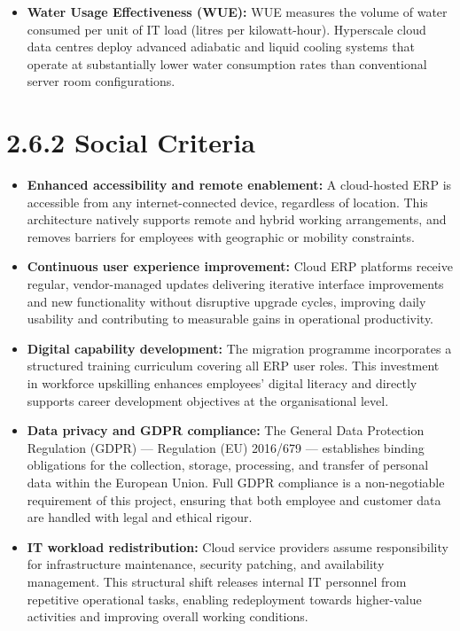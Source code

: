 \begin{itemize}[leftmargin=*, label=\textcolor{midgreen}{$\bullet$}]
  \item \textbf{Water Usage Effectiveness (WUE):} WUE measures the volume
    of water consumed per unit of IT load (litres per kilowatt-hour).
    Hyperscale cloud data centres deploy advanced adiabatic and liquid
    cooling systems that operate at substantially lower water consumption
    rates than conventional server room configurations.

\end{itemize}

\section{2.6.2 Social Criteria}

\begin{itemize}[leftmargin=*, label=\textcolor{midgreen}{$\bullet$}]

  \item \textbf{Enhanced accessibility and remote enablement:} A
    cloud-hosted ERP is accessible from any internet-connected device,
    regardless of location. This architecture natively supports remote and
    hybrid working arrangements, and removes barriers for employees with
    geographic or mobility constraints.

  \item \textbf{Continuous user experience improvement:} Cloud ERP
    platforms receive regular, vendor-managed updates delivering iterative
    interface improvements and new functionality without disruptive upgrade
    cycles, improving daily usability and contributing to measurable gains
    in operational productivity.

  \item \textbf{Digital capability development:} The migration programme
    incorporates a structured training curriculum covering all ERP user
    roles. This investment in workforce upskilling enhances employees'
    digital literacy and directly supports career development objectives at
    the organisational level.

  \item \textbf{Data privacy and GDPR compliance:} The General Data
    Protection Regulation (GDPR) --- Regulation (EU) 2016/679 ---
    establishes binding obligations for the collection, storage,
    processing, and transfer of personal data within the European Union.
    Full GDPR compliance is a non-negotiable requirement of this project,
    ensuring that both employee and customer data are handled with legal
    and ethical rigour.

  \item \textbf{IT workload redistribution:} Cloud service providers
    assume responsibility for infrastructure maintenance, security
    patching, and availability management. This structural shift releases
    internal IT personnel from repetitive operational tasks, enabling
    redeployment towards higher-value activities and improving overall
    working conditions.

\end{itemize}

